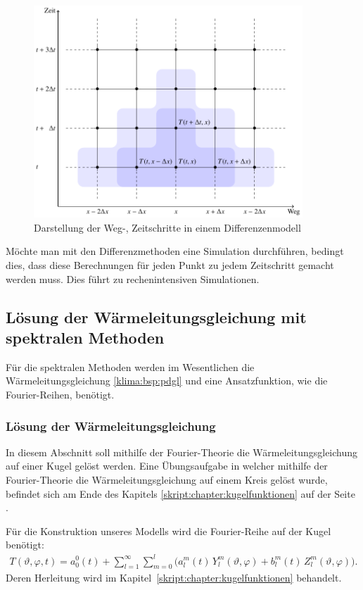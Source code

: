 \begin{refsection}
\begin{figure}
\centering
\includegraphics[width=0.9\textwidth]{klima/differenzen.pdf}
\caption{Darstellung der Weg-, Zeitschritte in einem Differenzenmodell
\label{klima:wettervorhersagen:diff}}
\end{figure}

Möchte man mit den Differenzmethoden eine Simulation durchführen,
bedingt dies, dass diese Berechnungen für jeden Punkt zu jedem
Zeitschritt gemacht werden muss. Dies führt zu rechenintensiven
Simulationen.

\subsection{Lösung der Wärmeleitungsgleichung mit spektralen Methoden}
Für die spektralen Methoden werden im Wesentlichen die
Wärmeleitungsgleichung \eqref{klima:bsp:pdgl}
und eine Ansatzfunktion, wie die Fourier-Reihen, benötigt.
%

\subsubsection{Lösung der Wärmeleitungsgleichung}
In diesem Abschnitt soll mithilfe der Fourier-Theorie die
Wärmeleitungsgleichung auf einer Kugel gelöst werden. Eine Übungsaufgabe
in welcher mithilfe der Fourier-Theorie die  Wärmeleitungsgleichung
auf einem Kreis gelöst wurde, befindet sich am Ende des Kapitels
\ref{skript:chapter:kugelfunktionen}
 auf der Seite
\pageref{skript:1101:pdgl}.

Für die Konstruktion unseres Modells wird die Fourier-Reihe auf der
Kugel benötigt:
\begin{align}
T(\vartheta ,\varphi ,t)
=
a^0_0(t) + \sum_{l=1}^\infty\sum_{m=0}^l \bigl( a^m_l(t)\,Y^m_l(\vartheta ,\varphi)+b^m_l(t)\,Z^m_l(\vartheta ,\varphi) \bigr).
\label{klima:equation:fourier}
\end{align}
Deren Herleitung wird im Kapitel~\ref{skript:chapter:kugelfunktionen}
 behandelt.


\end{refsection}
